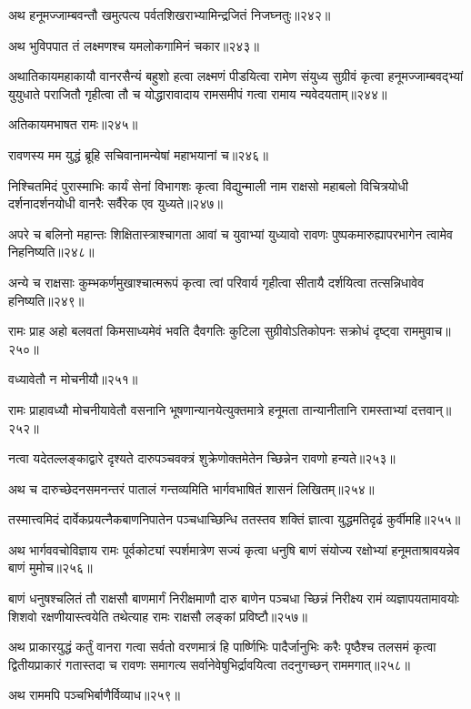 \begin{flushleft}
अथ हनूमज्जाम्बवन्तौ खमुत्पत्य पर्वतशिखराभ्यामिन्द्रजितं निजघ्नतुः॥२४२॥

अथ भुविपपात तं लक्ष्मणश्च यमलोकगामिनं चकार॥२४३॥

अथातिकायमहाकायौ वानरसैन्यं बहुशो हत्वा लक्ष्मणं पीडयित्वा रामेण संयुध्य सुग्रीवं कृत्वा हनूमज्जाम्बवद्भ्यां युयुधाते पराजितौ गृहीत्वा तौ च योद्धारावादाय रामसमीपं गत्वा रामाय न्यवेदयताम्॥२४४॥

अतिकायमभाषत रामः॥२४५॥

रावणस्य मम युद्धं ब्रूहि सचिवानामन्येषां महाभयानां च॥२४६॥


निश्चितमिदं पुरास्माभिः कार्यं सेनां विभागशः कृत्वा विद्युन्माली नाम राक्षसो महाबलो विचित्रयोधी दर्शनादर्शनयोधी वानरैः सर्वैरेक एव युध्यते॥२४७॥

अपरे च बलिनो महान्तः शिक्षितास्त्राश्चागता आवां च युवाभ्यां युध्यावो रावणः पुष्पकमारुह्यापरभागेन त्वामेव निहनिष्यति॥२४८॥

अन्ये च राक्षसाः कुम्भकर्णमुखाश्चात्मरूपं कृत्वा त्वां परिवार्य गृहीत्वा सीतायै दर्शयित्वा तत्सन्निधावेव हनिष्यति॥२४९॥

रामः प्राह अहो बलवतां किमसाध्यमेवं भवति दैवगतिः कुटिला सुग्रीवोऽतिकोपनः सक्रोधं दृष्ट्वा राममुवाच॥२५०॥

वध्यावेतौ न मोचनीयौ॥२५१॥

रामः प्राहावध्यौ मोचनीयावेतौ वसनानि भूषणान्यानयेत्युक्तमात्रे हनूमता तान्यानीतानि रामस्ताभ्यां दत्तवान्॥२५२॥

नत्वा यदेतल्लङ्काद्वारे दृश्यते दारुपञ्चवक्त्रं शुक्रेणोक्तमेतेन च्छिन्नेन रावणो हन्यते॥२५३॥

अथ च दारुच्छेदनसमनन्तरं पातालं गन्तव्यमिति भार्गवभाषितं शासनं लिखितम्॥२५४॥

तस्मात्त्वमिदं दार्वेकप्रयत्नैकबाणनिपातेन पञ्चधाच्छिन्धि ततस्तव शक्तिं ज्ञात्वा युद्धमतिदृढं कुर्वीमहि॥२५५॥

अथ भार्गववचोविज्ञाय रामः पूर्वकोट्यां स्पर्शमात्रेण सज्यं कृत्वा धनुषि बाणं संयोज्य रक्षोभ्यां हनूमताश्रावयन्नेव बाणं मुमोच॥२५६॥

बाणं धनुषश्चलितं तौ राक्षसौ बाणमार्गं निरीक्षमाणौ दारु बाणेन पञ्चधा च्छिन्नं निरीक्ष्य रामं व्यज्ञापयतामावयोः शिशवो रक्षणीयास्त्वयेति तथेत्याह रामः राक्षसौ लङ्कां प्रविष्टौ॥२५७॥

अथ प्राकारयुद्धं कर्तुं वानरा गत्वा सर्वतो वरणमात्रं हि पार्ष्णिभिः पादैर्जानुभिः करैः पृष्ठैश्च तलसमं कृत्वा द्वितीयप्राकारं गतास्तदा च रावणः समागत्य सर्वानेवेषुभिर्द्रावयित्वा तदनुगच्छन् राममगात्॥२५८॥

अथ राममपि पञ्चभिर्बाणैर्विव्याध॥२५९॥


\end{flushleft}
